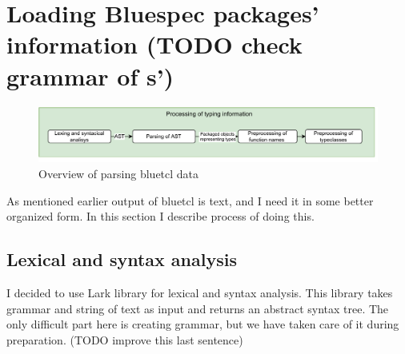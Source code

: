 \documentclass[12pt]{report}
\begin{document}
\section{Loading Bluespec packages' information (TODO check grammar of s')}
\begin{figure}[!h]
    \centering
    \caption{Overview of parsing bluetcl data}

    \includegraphics[width=1.0\columnwidth]{pdfExports/LargeMapProcessing.pdf}
\end{figure}
As mentioned earlier output of bluetcl is text, and I need it in some better organized form. In this section I describe process of doing this.
\subsection{Lexical and syntax analysis}
I decided to use Lark library for lexical and syntax analysis. This library takes grammar and string of text as input and returns an abstract syntax tree. The only difficult part here is creating grammar, but we have taken care of it during preparation. (TODO improve this last sentence)
\end{document}
